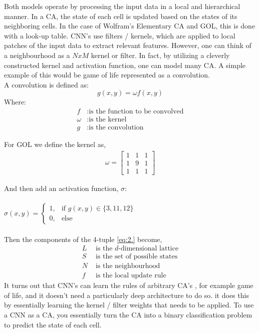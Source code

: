 Both models operate by processing the input data in a local and hierarchical manner. In a CA, the state of each cell is updated based on the states of its neighboring cells. In the case of Wolfram's Elementary CA and GOL, this is done with a look-up table. CNN's use filters / kernels, which are applied to local patches of the input data to extract relevant features. However, one can think of a neighbourhood as a $NxM$ kernel or filter. In fact, by utilizing a cleverly constructed kernel and activation function, one can model many CA. A simple example of this would be game of life represented as a convolution. \\

A convolution is defined as: \\

\begin{equation*}
	g(x,y) = \omega f(x, y)
\end{equation*}
Where:
\begin{align*}
	f &: \text{is the function to be convolved} \\
	\omega &: \text{is the kernel}  \\
	g &: \text{is the convolution} 
\end{align*} 

For GOL we define the kernel as,
\begin{gather*}
	\omega = 
	\begin{bmatrix}
		1 & 1 & 1 \\
		1 & 9 & 1 \\
		1 & 1 & 1
	\end{bmatrix}
\end{gather*}


And then add an activation function, $\sigma$: \\ \\

$
\sigma(x, y) = \begin{cases}
	1, & \text{if } g(x, y) \in \{3, 11, 12\} \\
	0, & \text{else}
\end{cases}
$
\\ \\

Then the components of the 4-tuple \ref{eq:2.} become,
\begin{align*}
	L &  \text{ is the } d \text{-dimensional lattice} \\
	S &  \text{ is the set of possible states} \\
	N &  \text{ is the neighbourhood} \\
	f &  \text{ is the local update rule}
\end{align*} 
It turns out that CNN's can learn the rules of arbitrary CA's \cite{PhysRevE.100.032402}, for example game of life, and it doesn't need a particularly deep architecture to do so. it does this by essentially learning the kernel / filter weights that needs to be applied. To use a CNN as a CA, you essentially turn the CA into a binary classification problem to predict the state of each cell.


